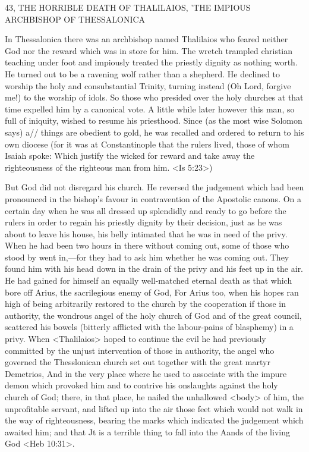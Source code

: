 43, THE HORRIBLE DEATH OF THALILAIOS,
'THE IMPIOUS ARCHBISHOP OF THESSALONICA

In Thessalonica there was an archbishop named Thalilaios who
feared neither God nor the reward which was in store for him. The
wretch trampled christian teaching under foot and impiously treated
the priestly dignity as nothing worth. He turned out to be a
ravening wolf rather than a shepherd. He declined to worship the
holy and consubstantial Trinity, turning instead (Oh Lord, forgive
me!) to the worship of idols. So those who presided over the holy
churches at that time expelled him by a canonical vote. A little while
later however this man, so full of iniquity, wished to resume his
priesthood. Since (as the most wise Solomon says) a// things are
obedient to gold, he was recalled and ordered to return to his own
diocese (for it was at Constantinople that the rulers lived, those of
whom Isaiah spoke: Which justify the wicked for reward and take
away the righteousness of the righteous man from him. <Is 5:23>)

But God did not disregard his church. He reversed the judgement
which had been pronounced in the bishop's favour in contravention
of the Apostolic canons. On a certain day when he was all dressed
up splendidly and ready to go before the rulers in order to regain
his priestly dignity by their decision, just as he was about to leave
his house, his belly intimated that he was in need of the privy.
When he had been two hours in there without coming out, some of
those who stood by went in,—for they had to ask him whether he
was coming out. They found him with his head down in the drain
of the privy and his feet up in the air. He had gained for himself an
equally well-matched eternal death as that which bore off Arius, the
sacrilegious enemy of God, For Arius too, when his hopes ran high
of being arbitrarily restored to the church by the cooperation if
those in authority, the wondrous angel of the holy church of God
and of the great council, scattered his bowels (bitterly afflicted with
the labour-pains of blasphemy) in a privy. When <Thalilaios>
hoped to continue the evil he had previously committed by the
unjust intervention of those in authority, the angel who governed
the Thesslonican church set out together with the great martyr
Demetrios, And in the very place where he used to associate with
the impure demon which provoked him and to contrive his
onslaughts against the holy church of God; there, in that place, he
nailed the unhallowed <body> of him, the unprofitable servant, and
lifted up into the air those feet which would not walk in the way of
righteousness, bearing the marks which indicated the judgement
which awaited him; and that Jt is a terrible thing to fall into the
Aands of the living God <Heb 10:31>.

